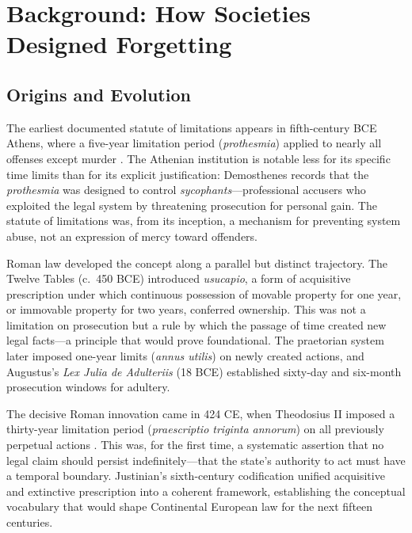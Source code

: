 \documentclass[12pt]{article}
\begin{document}
\section{Background: How Societies Designed Forgetting}
\label{sec:background}

\subsection{Origins and Evolution}
\label{sec:origins}

The earliest documented statute of limitations appears in fifth-century BCE Athens, where a five-year limitation period (\emph{prothesmia}) applied to nearly all offenses except murder \citep{demosthenes}. The Athenian institution is notable less for its specific time limits than for its explicit justification: Demosthenes records that the \emph{prothesmia} was designed to control \emph{sycophants}---professional accusers who exploited the legal system by threatening prosecution for personal gain. The statute of limitations was, from its inception, a mechanism for preventing system abuse, not an expression of mercy toward offenders.

Roman law developed the concept along a parallel but distinct trajectory. The Twelve Tables (c.~450 BCE) introduced \emph{usucapio}, a form of acquisitive prescription under which continuous possession of movable property for one year, or immovable property for two years, conferred ownership. This was not a limitation on prosecution but a rule by which the passage of time created new legal facts---a principle that would prove foundational. The praetorian system later imposed one-year limits (\emph{annus utilis}) on newly created actions, and Augustus's \emph{Lex Julia de Adulteriis} (18 BCE) established sixty-day and six-month prosecution windows for adultery.

The decisive Roman innovation came in 424 CE, when Theodosius II imposed a thirty-year limitation period (\emph{praescriptio triginta annorum}) on all previously perpetual actions \citep{codex-theodosianus}. This was, for the first time, a systematic assertion that no legal claim should persist indefinitely---that the state's authority to act must have a temporal boundary. Justinian's sixth-century codification unified acquisitive and extinctive prescription into a coherent framework, establishing the conceptual vocabulary that would shape Continental European law for the next fifteen centuries.
\end{document}

